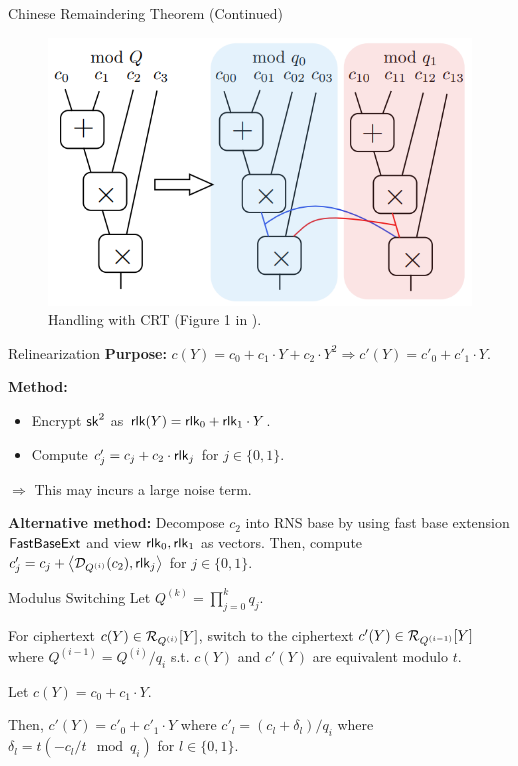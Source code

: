 \begin{frame}{Chinese Remaindering Theorem (Continued)}
	\begin{figure}
		\centering
		\includegraphics[width=1\linewidth]{CRT}
		\caption{Handling with CRT (Figure 1 in \cite{CIC:ABPS24}).}
		\label{fig:crt}
	\end{figure}
	
\end{frame}

\begin{frame}{Relinearization}
	\textbf{Purpose:} $c(Y) = c_0 + c_1 \cdot Y + c_2 \cdot Y^2 \Rightarrow c'(Y) = c'_0 + c'_1 \cdot Y$.
	
	\textbf{Method:}
	\begin{itemize}
		\item Encrypt $\mathsf{sk}^2$ as $\mathsf{rlk}(Y) = \mathsf{rlk}_0 + \mathsf{rlk}_1 \cdot Y$. 
		\item Compute $c'_j = c_j + c_2 \cdot \mathsf{rlk}_j$ for $j \in \{0,1\}$.
	\end{itemize} 
	
	$\Rightarrow$ This may incurs a large noise term.
	
	\textbf{Alternative method:} Decompose $c_2$ into RNS base by using fast base extension $\mathsf{FastBaseExt}$ and view $\mathsf{rlk}_0, \mathsf{rlk}_1$ as vectors. Then, compute $c'_j = c_j + \left\langle\mathcal{D}_{Q^{(i)}}(c_2),\mathsf{rlk}_j\right\rangle$ for $j \in \{0,1\}$.
\end{frame}

\begin{frame}{Modulus Switching}
	Let $Q^{(k)} = \prod_{j = 0}^k q_j$.
	
	For ciphertext $c(Y) \in \mathcal{R}_{Q^{(i)}}[Y]$, switch to the ciphertext $c'(Y) \in \mathcal{R}_{Q^{(i-1)}}[Y]$ where $Q^{(i-1)} = Q^{(i)} / q_i$ s.t. $c(Y)$ and $c'(Y)$ are equivalent modulo $t$.
	
	Let $c(Y) = c_0 + c_1\cdot Y$.
	
	Then, $c'(Y) = c'_0 + c'_1 \cdot Y$ where $c'_l = (c_l + \delta_l)/q_i$ where $\delta_l = t (-c_l/t \mod q_i)$ for $l \in \{0,1\}$.
\end{frame}